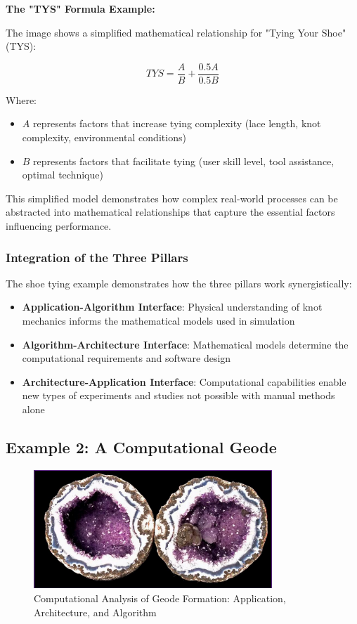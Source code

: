 \textbf{The "TYS" Formula Example:}

The image shows a simplified mathematical relationship for "Tying Your Shoe" (TYS):

\begin{equation}
TYS = \frac{A}{B} + \frac{0.5A}{0.5B}
\end{equation}

Where:
\begin{itemize}
    \item $A$ represents factors that increase tying complexity (lace length, knot complexity, environmental conditions)
    \item $B$ represents factors that facilitate tying (user skill level, tool assistance, optimal technique)
\end{itemize}

This simplified model demonstrates how complex real-world processes can be abstracted into mathematical relationships that capture the essential factors influencing performance.

\subsubsection{Integration of the Three Pillars}

The shoe tying example demonstrates how the three pillars work synergistically:

\begin{itemize}
    \item \textbf{Application-Algorithm Interface}: Physical understanding of knot mechanics informs the mathematical models used in simulation
    \item \textbf{Algorithm-Architecture Interface}: Mathematical models determine the computational requirements and software design
    \item \textbf{Architecture-Application Interface}: Computational capabilities enable new types of experiments and studies not possible with manual methods alone
\end{itemize}

\subsection{Example 2: A Computational Geode}

\begin{figure}[h]
 \centering
 \includegraphics[width=0.8\textwidth]{images/computational_geode.png}
 \caption{Computational Analysis of Geode Formation: Application, Architecture, and Algorithm}
 \label{fig:computational_geode}
\end{figure}

